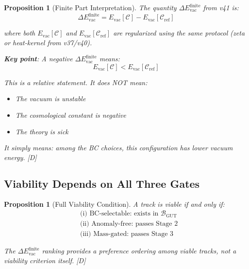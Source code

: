 \documentclass[11pt,a4paper]{article}
\newtheorem{proposition}[theorem]{Proposition}
\newcommand{\tagD}{\textcolor{blue!70!black}{[D]}}
\begin{document}
\begin{proposition}[Finite Part Interpretation]
\label{prop:finite-part}
The quantity $\Delta E_{\text{vac}}^{\text{finite}}$ from v41 is:
\begin{equation}
\label{eq:delta-E-def}
\Delta E_{\text{vac}}^{\text{finite}} = E_{\text{vac}}[\mathcal{C}] - E_{\text{vac}}[\mathcal{C}_{\text{ref}}]
\end{equation}

where both $E_{\text{vac}}[\mathcal{C}]$ and $E_{\text{vac}}[\mathcal{C}_{\text{ref}}]$ are
regularized using the same protocol (zeta or heat-kernel from v37/v40).

\textbf{Key point}: A negative $\Delta E_{\text{vac}}^{\text{finite}}$ means:
\begin{equation}
\label{eq:negative-meaning}
E_{\text{vac}}[\mathcal{C}] < E_{\text{vac}}[\mathcal{C}_{\text{ref}}]
\end{equation}

This is a \textit{relative} statement. It does NOT mean:
\begin{itemize}
    \item The vacuum is unstable
    \item The cosmological constant is negative
    \item The theory is sick
\end{itemize}

It simply means: among the BC choices, this configuration has lower vacuum energy.
\tagD
\end{proposition}

\subsection{Viability Depends on All Three Gates}

\begin{proposition}[Full Viability Condition]
\label{prop:full-viability}
A track is viable if and only if:
\begin{align}
\label{eq:viability-1}
& \text{(i) BC-selectable: exists in } \mathcal{B}_{\text{GUT}} \\
\label{eq:viability-2}
& \text{(ii) Anomaly-free: passes Stage 2} \\
\label{eq:viability-3}
& \text{(iii) Mass-gated: passes Stage 3}
\end{align}

The $\Delta E_{\text{vac}}^{\text{finite}}$ ranking provides a \textit{preference ordering}
among viable tracks, not a viability criterion itself.
\tagD
\end{proposition}
\end{document}
